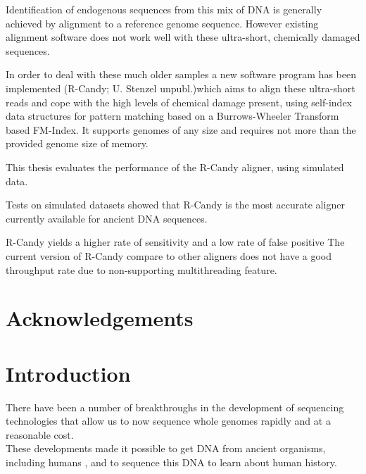 \documentclass[11pt,a4paper]{report}
\begin{document}
Identification of endogenous sequences from this mix of DNA is generally achieved by alignment to a reference genome sequence. 
However existing alignment software does not work well with these ultra-short, chemically damaged sequences.

In order to deal with these much older samples a new software program has been implemented
(R-Candy; U. Stenzel unpubl.)which aims to align these ultra-short reads and cope with the high 
levels of chemical damage present, using self-index data structures for pattern matching
based on a Burrows-Wheeler Transform based FM-Index.
It supports genomes of any size and requires not more than the provided genome size of memory.

This thesis evaluates the performance of the R-Candy aligner, using simulated data.

Tests on simulated datasets showed that R-Candy is the most accurate aligner currently available for ancient DNA sequences.

R-Candy yields a higher rate of sensitivity 
and a low rate of false positive
The current version of R-Candy compare to other aligners does not have a good throughput rate due to non-supporting multithreading feature. 

\newpage\null\thispagestyle{empty}\newpage
\section*{Acknowledgements}
\newpage\null\thispagestyle{empty}\newpage

\tableofcontents
\newpage
\listoftables
\newpage
\listoffigures
\newpage




\section{Introduction}


There have been a number of breakthroughs in the development of sequencing technologies that allow us to now sequence whole genomes rapidly and at a reasonable cost\cite{NGS}\cite{454}\cite{NGS2}.
\\
These developments made it possible to get DNA from ancient organisms, including humans \cite{AncientDNA}\cite{fish2human}, and to sequence this DNA to learn about human history\cite{impactOFhg}\cite{ourGenome}\cite{SNP}.
\end{document}
